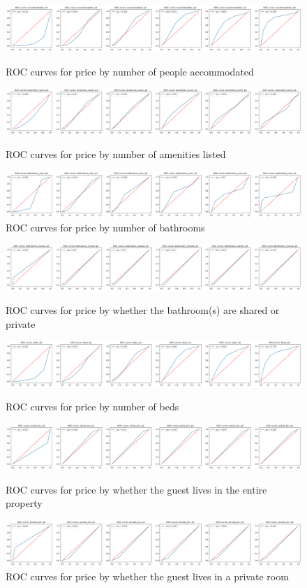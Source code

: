 \documentclass[12pt]{article}
\newtheorem{Proof of Lemma}{Proof of Lemma}
\begin{document}
\begin{figure}[H]
	\includegraphics*[width=\textwidth]{../figures/property_features/accommodates_roc.png}
	\caption*{ROC curves for price by number of people accommodated}
	\includegraphics*[width=\textwidth]{../figures/property_features/amenities_count_roc.png}
	\caption*{ROC curves for price by number of amenities listed}
	\includegraphics*[width=\textwidth]{../figures/property_features/bathrooms_num_roc.png}
	\caption*{ROC curves for price by number of bathrooms}
\end{figure}
\begin{figure}[H]
	\includegraphics*[width=\textwidth]{../figures/property_features/bathrooms_shared_roc.png}
	\caption*{ROC curves for price by whether the bathroom(s) are shared or private}
	\includegraphics*[width=\textwidth]{../figures/property_features/beds_roc.png}
	\caption*{ROC curves for price by number of beds}
	\includegraphics*[width=\textwidth]{../figures/property_features/room_entire_roc.png}
	\caption*{ROC curves for price by whether the guest lives in the entire property}
	\includegraphics*[width=\textwidth]{../figures/property_features/room_private_roc.png}
	\caption*{ROC curves for price by whether the guest lives in a private room}
\end{figure}
\end{document}
